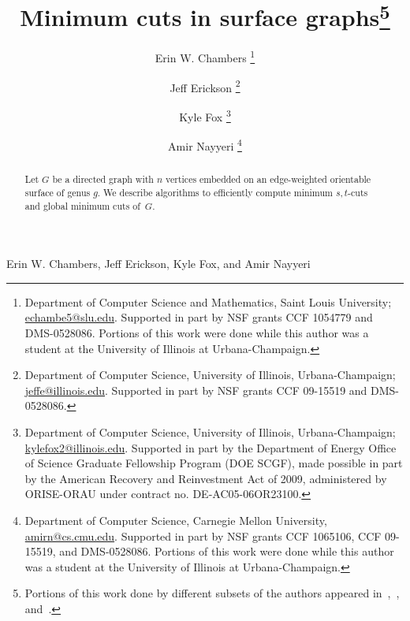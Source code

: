 \documentclass[11pt,twoside]{article}
\begin{document}
\pagestyle{myheadings}
		 {Erin W. Chambers, Jeff Erickson, Kyle Fox, and Amir Nayyeri}

\begin{titlepage}

\title{Minimum cuts in surface graphs\footnote{
Portions of this work done by different subsets of the authors appeared in~\cite{cen-mcshc-09},~\cite{en-mcsnc-11}, and~\cite{efn-gmcse-12}.
}}

\author{
  Erin W. Chambers%
  \thanks{Department of Computer Science and Mathematics, Saint Louis
  University;
  \url{echambe5@slu.edu}.  Supported in part by NSF grants CCF 1054779 and DMS-0528086.
  Portions of this work were done while this author was a student at the University of Illinois at Urbana-Champaign.}
  \and
  Jeff Erickson%
  \thanks{Department of Computer Science,
  University of Illinois, Urbana-Champaign; \url{jeffe@illinois.edu}.
  Supported in part by NSF grants CCF 09-15519 and DMS-0528086.
  }
  \and
  Kyle Fox%
  \thanks{Department of Computer Science,
      University of Illinois, Urbana-Champaign;
      \url{kylefox2@illinois.edu}.
      Supported in part by
      the Department of Energy Office
      of Science Graduate Fellowship Program (DOE SCGF),
      made possible in part by the American Recovery and
      Reinvestment Act of 2009, administered by ORISE-ORAU
      under contract no. DE-AC05-06OR23100.}
  \and
  Amir Nayyeri%
  \thanks{Department of Computer Science,
      Carnegie Mellon University,
      \url{amirn@cs.cmu.edu}. Supported in part by NSF grants
      CCF 1065106, CCF 09-15519, and DMS-0528086. Portions of this work were done while this author was a student 
      at the University of Illinois at Urbana-Champaign.}
      }

\DRAFT

\maketitle
\begin{abstract}
Let $G$ be a directed graph with $n$ vertices embedded on an edge-weighted orientable surface of genus $g$.
We describe algorithms to efficiently compute minimum $s,t$-cuts and global minimum cuts of~$G$.
\end{abstract}

\noindent

\thispagestyle{empty}
\setcounter{page}{0}
\end{titlepage}







\end{document}
